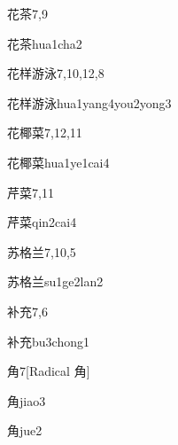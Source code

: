 \begin{entry}{花茶}{7,9}
  \begin{phonetics}{花茶}{hua1cha2}
  \end{phonetics}
\end{entry}

\begin{entry}{花样游泳}{7,10,12,8}
  \begin{phonetics}{花样游泳}{hua1yang4you2yong3}
  \end{phonetics}
\end{entry}

\begin{entry}{花椰菜}{7,12,11}
  \begin{phonetics}{花椰菜}{hua1ye1cai4}
  \end{phonetics}
\end{entry}

\begin{entry}{芹菜}{7,11}
  \begin{phonetics}{芹菜}{qin2cai4}
  \end{phonetics}
\end{entry}

\begin{entry}{苏格兰}{7,10,5}
  \begin{phonetics}{苏格兰}{su1ge2lan2}
  \end{phonetics}
\end{entry}

\begin{entry}{补充}{7,6}
  \begin{phonetics}{补充}{bu3chong1}
  \end{phonetics}
\end{entry}

\begin{entry}{角}{7}[Radical 角]
  \begin{phonetics}{角}{jiao3}
  \end{phonetics}
  \begin{phonetics}{角}{jue2}
  \end{phonetics}
\end{entry}

